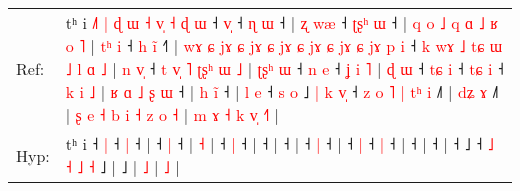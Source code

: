 \documentclass[10pt]{article}
\DeclareRobustCommand{\hl}[1]{{\textcolor{red}{#1}}}
\begin{document}
\begin{longtable}{ll}
Ref: & tʰ i\hl{ }\hl{˩}\hl{˥}\hl{ }\hl{|}\hl{ }\hl{ɖ}\hl{ }\hl{ɯ}\hl{ }\hl{˧}\hl{ }\hl{v}\hl{̩}\hl{ }\hl{˧}\hl{ }\hl{ɖ}\hl{ }\hl{ɯ} ˧ \hl{v}\hl{̩} ˧\hl{ }\hl{ɳ} \hl{ɯ} ˧ |\hl{ }\hl{ʐ}\hl{ }\hl{w}\hl{æ} ˧\hl{ }\hl{ʈ}\hl{ʂ}\hl{ʰ} \hl{ɯ} ˧ |\hl{ }\hl{q}\hl{ }\hl{o}\hl{ }\hl{˩}\hl{ }\hl{q}\hl{ }\hl{ɑ}\hl{ }\hl{˩}\hl{ }\hl{ʁ}\hl{ }\hl{o} \hl{˥} |\hl{ }\hl{t}\hl{ʰ}\hl{ }\hl{i} ˧\hl{ }\hl{h} \hl{i}\hl{̃} ˧\hl{˥} |\hl{ }\hl{w}\hl{ɤ}\hl{ }\hl{ɕ}\hl{ }\hl{j}\hl{ɤ}\hl{ }\hl{ɕ}\hl{ }\hl{j}\hl{ɤ}\hl{ }\hl{ɕ}\hl{ }\hl{j}\hl{ɤ}\hl{ }\hl{ɕ}\hl{ }\hl{j}\hl{ɤ}\hl{ }\hl{ɕ}\hl{ }\hl{j}\hl{ɤ}\hl{ }\hl{ɕ}\hl{ }\hl{j}\hl{ɤ}\hl{ }\hl{p}\hl{ }\hl{i} ˧\hl{ }\hl{k}\hl{ }\hl{w}\hl{ɤ}\hl{ }\hl{˩}\hl{ }\hl{t}\hl{ɕ}\hl{ }\hl{ɯ}\hl{ }\hl{˩}\hl{ }\hl{l}\hl{ }\hl{ɑ}\hl{ }\hl{˩} |\hl{ }\hl{n}\hl{ }\hl{v}\hl{̩} ˧\hl{ }\hl{t}\hl{ }\hl{v}\hl{̩}\hl{ }\hl{˥}\hl{ }\hl{ʈ}\hl{ʂ}\hl{ʰ}\hl{ }\hl{ɯ}\hl{ }\hl{˩} |\hl{ }\hl{ʈ}\hl{ʂ}\hl{ʰ}\hl{ }\hl{ɯ} ˧\hl{ }\hl{n} \hl{e} ˧\hl{ }\hl{ʝ}\hl{ }\hl{i}\hl{ }\hl{˥} |\hl{ }\hl{ɖ}\hl{ }\hl{ɯ} ˧\hl{ }\hl{t}\hl{ɕ} \hl{i} ˧\hl{ }\hl{t}\hl{ɕ} \hl{i} ˧\hl{ }\hl{k}\hl{ }\hl{i}\hl{ }\hl{˩} |\hl{ }\hl{ʁ}\hl{ }\hl{ɑ}\hl{ }\hl{˩}\hl{ }\hl{ʂ}\hl{ }\hl{ɯ} ˧ |\hl{ }\hl{h}\hl{ }\hl{i}\hl{̃} ˧ |\hl{ }\hl{l}\hl{ }\hl{e} ˧\hl{ }\hl{s}\hl{ }\hl{o} ˩\hl{ }\hl{|}\hl{ }\hl{k}\hl{ }\hl{v}\hl{̩} ˧\hl{ }\hl{z}\hl{ }\hl{o} \hl{˥} \hl{|} \hl{t}\hl{ʰ} \hl{i} ˩\hl{˥} |\hl{ }\hl{d}\hl{ʑ}\hl{ }\hl{ɤ} ˩\hl{˥} |\hl{ }\hl{ʂ}\hl{ }\hl{e}\hl{ }\hl{˧}\hl{ }\hl{b}\hl{ }\hl{i}\hl{ }\hl{˧}\hl{ }\hl{z}\hl{ }\hl{o} \hl{˧} |\hl{ }\hl{m}\hl{ }\hl{ɤ}\hl{ }\hl{˧}\hl{ }\hl{k}\hl{ }\hl{v}\hl{̩} \hl{˧}\hl{˥} |
 \\
Hyp: & tʰ i\hl{}\hl{}\hl{}\hl{}\hl{}\hl{}\hl{}\hl{}\hl{}\hl{}\hl{}\hl{}\hl{}\hl{}\hl{}\hl{}\hl{}\hl{}\hl{}\hl{} ˧ \hl{}\hl{|} ˧\hl{}\hl{} \hl{|} ˧ |\hl{}\hl{}\hl{}\hl{}\hl{} ˧\hl{}\hl{}\hl{}\hl{} \hl{|} ˧ |\hl{}\hl{}\hl{}\hl{}\hl{}\hl{}\hl{}\hl{}\hl{}\hl{}\hl{}\hl{}\hl{}\hl{}\hl{}\hl{} \hl{˧} |\hl{}\hl{}\hl{}\hl{}\hl{} ˧\hl{}\hl{} \hl{}\hl{|} ˧\hl{} |\hl{}\hl{}\hl{}\hl{}\hl{}\hl{}\hl{}\hl{}\hl{}\hl{}\hl{}\hl{}\hl{}\hl{}\hl{}\hl{}\hl{}\hl{}\hl{}\hl{}\hl{}\hl{}\hl{}\hl{}\hl{}\hl{}\hl{}\hl{}\hl{}\hl{}\hl{}\hl{}\hl{}\hl{}\hl{}\hl{}\hl{} ˧\hl{}\hl{}\hl{}\hl{}\hl{}\hl{}\hl{}\hl{}\hl{}\hl{}\hl{}\hl{}\hl{}\hl{}\hl{}\hl{}\hl{}\hl{}\hl{}\hl{} |\hl{}\hl{}\hl{}\hl{}\hl{} ˧\hl{}\hl{}\hl{}\hl{}\hl{}\hl{}\hl{}\hl{}\hl{}\hl{}\hl{}\hl{}\hl{}\hl{}\hl{} |\hl{}\hl{}\hl{}\hl{}\hl{}\hl{} ˧\hl{}\hl{} \hl{|} ˧\hl{}\hl{}\hl{}\hl{}\hl{}\hl{} |\hl{}\hl{}\hl{}\hl{} ˧\hl{}\hl{}\hl{} \hl{|} ˧\hl{}\hl{}\hl{} \hl{|} ˧\hl{}\hl{}\hl{}\hl{}\hl{}\hl{} |\hl{}\hl{}\hl{}\hl{}\hl{}\hl{}\hl{}\hl{}\hl{}\hl{} ˧ |\hl{}\hl{}\hl{}\hl{}\hl{} ˧ |\hl{}\hl{}\hl{}\hl{} ˧\hl{}\hl{}\hl{}\hl{} ˩\hl{}\hl{}\hl{}\hl{}\hl{}\hl{}\hl{} ˧\hl{}\hl{}\hl{}\hl{} \hl{˩} \hl{˧} \hl{}\hl{˩} \hl{˧} ˩\hl{} |\hl{}\hl{}\hl{}\hl{}\hl{} ˩\hl{} |\hl{}\hl{}\hl{}\hl{}\hl{}\hl{}\hl{}\hl{}\hl{}\hl{}\hl{}\hl{}\hl{}\hl{}\hl{}\hl{} \hl{˩} |\hl{}\hl{}\hl{}\hl{}\hl{}\hl{}\hl{}\hl{}\hl{}\hl{}\hl{} \hl{}\hl{˩} |

\end{longtable}
\end{document}
